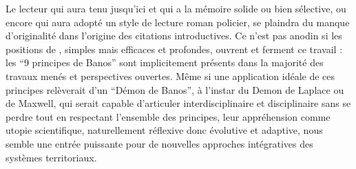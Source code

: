 Le lecteur qui aura tenu jusqu'ici et qui a la mémoire solide ou bien sélective, ou encore qui aura adopté un style de lecture roman policier, se plaindra du manque d'originalité dans l'origine des citations introductives. Ce n'est pas anodin si les positions de , simples mais efficaces et profondes, ouvrent et ferment ce travail : les ``9 principes de Banos'' sont implicitement présents dans la majorité des travaux menés et perspectives ouvertes. Même si une application idéale de ces principes relèverait d'un ``Démon de Banos'', à l'instar du Demon de Laplace ou de Maxwell, qui serait capable d'articuler interdisciplinaire et disciplinaire sans se perdre tout en respectant l'ensemble des principes, leur appréhension comme utopie scientifique, naturellement réflexive donc évolutive et adaptive, nous semble une entrée puissante pour de nouvelles approches intégratives des systèmes territoriaux.





































